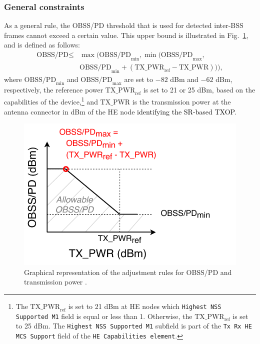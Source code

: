 \documentclass{ieeeaccess}
\begin{document}
\subsubsection{General constraints}
As a general rule, the OBSS/PD threshold that is used for detected inter-BSS frames cannot exceed a certain value. This upper bound is illustrated in Fig.~\ref{fig:fig_7}, and is defined as follows:
\begin{align}\nonumber \text{OBSS/PD} \leq & \max\Big(\text{OBSS/PD}_{\min}, \min\big(\text{OBSS/PD}_{\max},\\ & \text{OBSS/PD}_{\min} + (\text{TX\_PWR}_{\text{ref}}-\text{TX\_PWR})\big)\Big), \nonumber \end{align}
where $\text{OBSS/PD}_{\min}$ and $\text{OBSS/PD}_{\max}$ are set to $-82$ dBm and $-62$ dBm, respectively, the reference power $\text{TX\_PWR}_{\text{ref}}$ is set to 21 or 25 dBm, based on the
capabilities of the device,\footnote{The $\text{TX\_PWR}_{\text{ref}}$ is set to 21 dBm at HE nodes which \texttt{Highest NSS Supported M1} field is equal or less than 1. Otherwise, the  $\text{TX\_PWR}_{\text{ref}}$ is set to 25 dBm. The \texttt{Highest NSS Supported M1} subfield is part of the \texttt{Tx Rx HE MCS Support} field of the \texttt{HE Capabilities element}.} and $\text{TX\_PWR}$ is the transmission power at the antenna connector in dBm of the HE node \textcolor{black}{identifying the SR-based TXOP}.
\begin{figure}[ht!]
	\centering
	\includegraphics[width=0.8\columnwidth]{fig_10}
	\caption{Graphical representation of the adjustment rules for OBSS/PD and transmission power \cite{tgax2019draft}.}
	\label{fig:fig_7}
\end{figure}
\end{document}
